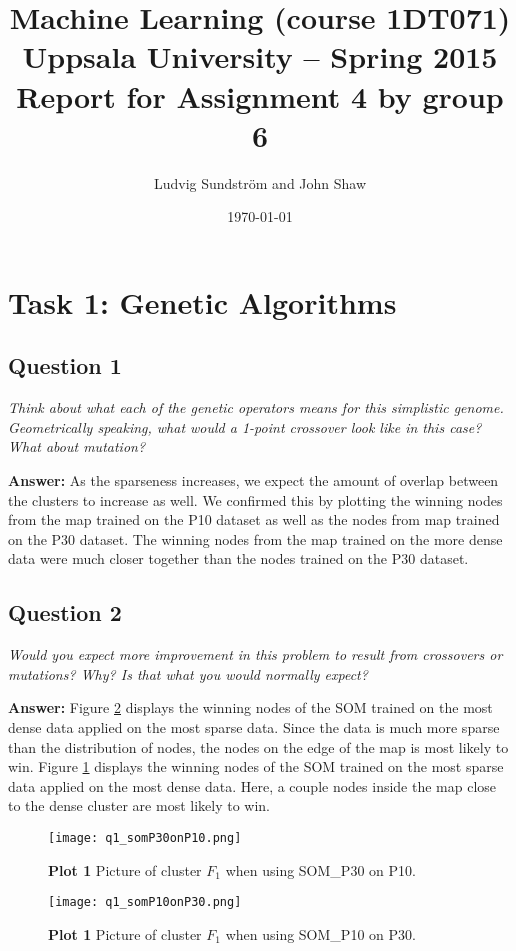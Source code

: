 \documentclass[a4paper]{article}
\title{Machine Learning (course 1DT071)
Uppsala University – Spring 2015
Report for Assignment 4 by group 6}
\author{Ludvig Sundstr\"{o}m and John Shaw}
\date{\today}
\begin{document}
\maketitle

\section*{Task 1: Genetic Algorithms}

\subsection*{Question 1} 

\emph{Think about what each of the genetic operators means for this
simplistic genome. Geometrically speaking, what would a 1-point crossover look like in this case? What about mutation?}

\textbf{Answer:} As the sparseness increases, we expect the amount of overlap between the clusters to increase as well. We confirmed this by plotting the winning nodes from the map trained on the P10 dataset as well as the nodes from map trained on the P30 dataset. The winning nodes from the map trained on the more dense data were much closer together than the nodes trained on the P30 dataset. 

\subsection*{Question 2}
\emph{Would you expect more improvement in this problem to result
from crossovers or mutations? Why? Is that what you would normally expect?}

\textbf{Answer:} Figure \ref{fig:q1_somP10onP30} displays the winning nodes of the SOM trained on the most dense data applied on the most sparse data. Since the data is much more sparse than the distribution of nodes, the nodes on the edge of the map is most likely to win. Figure \ref{fig:q1_somP30onP10} displays the winning nodes of the SOM trained on the most sparse data applied on the most dense data. Here, a couple nodes inside the map close to the dense cluster are most likely to win. 

\begin{figure}[H] %
	\texttt{[image: q1\_somP30onP10.png]}
	\caption{\label{fig:q1_somP30onP10}\textbf{Plot 1} Picture of cluster $F_1$ when using SOM\_P30 on P10.}
\end{figure}
\begin{figure}[H] %
	\texttt{[image: q1\_somP10onP30.png]}
	\caption{\label{fig:q1_somP10onP30}\textbf{Plot 1} Picture of cluster $F_1$ when using SOM\_P10 on P30.}
\end{figure}
\end{document}
